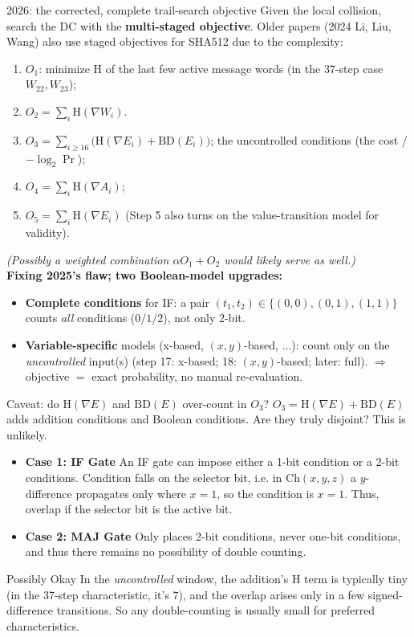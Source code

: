 \documentclass[aspectratio=169,9pt]{beamer}
\newcommand{\hwt}{\mathrm{H}}
\newcommand{\bd}{\mathrm{BD}}
\newcommand{\key}[1]{\textcolor{key}{\textbf{#1}}}
\begin{document}
\begin{frame}{2026: the corrected, complete trail-search objective}
Given the local collision, search the DC with the \key{multi-staged objective}. Older papers (2024 Li, Liu, Wang) also use staged objectives for SHA512 due to the complexity:
\begin{enumerate}
  \item $O_1$: minimize $\hwt$ of the last few active message words (in the 37-step case $W_{22},W_{23}$); 
  \item $O_2=\sum_i \hwt(\nabla W_i)$.
  \item \key{$O_3=\sum_{i\ge 16}\big(\hwt(\nabla E_i)+\bd(E_i)\big)$}; the uncontrolled conditions (the cost / $-\log_2\Pr$);
  \item $O_4=\sum_i \hwt(\nabla A_i)$; 
  \item $O_5=\sum_i \hwt(\nabla E_i)$ (Step 5 also turns on the value-transition model for validity).
\end{enumerate}
\emph{(Possibly a weighted combination $\alpha O_1+O_2$ would likely serve as well.)}
\vspace{0.3em}\\
\textbf{Fixing 2025's flaw; two Boolean-model upgrades:}
\begin{itemize}
  \item \key{Complete conditions} for IF: a pair $(t_1,t_2)\in\{(0,0),(0,1),(1,1)\}$ counts \emph{all} conditions ($0/1/2$), not only 2-bit.
  \item \key{Variable-specific} models (x-based, $(x,y)$-based, $\dots$): count only on the \emph{uncontrolled} input(s) (step 17: x-based; 18: $(x,y)$-based; later: full). $\Rightarrow$ objective $=$ exact probability, no manual re-evaluation.
\end{itemize}
\end{frame}

\begin{frame}{Caveat: do $\hwt(\nabla E)$ and $\bd(E)$ over-count in $O_3$?}
$O_3=\hwt(\nabla E)+\bd(E)$ adds addition conditions and Boolean conditions. Are they truly disjoint? This is unlikely.

\begin{itemize}
  \item \key{Case 1: IF Gate} An IF gate can impose either a 1-bit condition or a 2-bit conditions. Condition falls on the selector bit, i.e. in $\mathrm{Ch}(x,y,z)$ a $y$-difference propagates only where $x{=}1$, so the condition is $x{=}1$. Thus, overlap if the selector bit is the active bit. 
  \item \key{Case 2: MAJ Gate} Only places 2-bit conditions, never one-bit conditions, and thus there remains no possibility of double counting.
\end{itemize}

\begin{block}{Possibly Okay}
 In the \emph{uncontrolled} window, the addition's $\hwt$ term is typically tiny (in the 37-step characteristic, it's 7), and the overlap arises only in a few signed-difference transitions. So any double-counting is usually small for preferred characteristics.
\end{block}
\end{frame}
\end{document}
